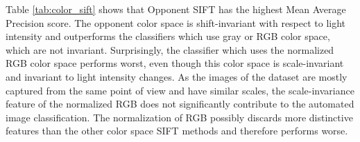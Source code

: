 Table \ref{tab:color_sift} shows that Opponent SIFT has the highest Mean Average Precision score. The opponent color space is shift-invariant with respect to light intensity and outperforms the classifiers which use gray or RGB color space, which are not invariant. Surprisingly, the classifier which uses the normalized RGB color space performs worst, even though this color space is scale-invariant and invariant to light intensity changes. As the images of the dataset are mostly captured from the same point of view and have similar scales, the scale-invariance feature of the normalized RGB does not significantly contribute to the automated image classification. The normalization of RGB possibly discards more distinctive features than the other color space SIFT methods and therefore performs worse.\\